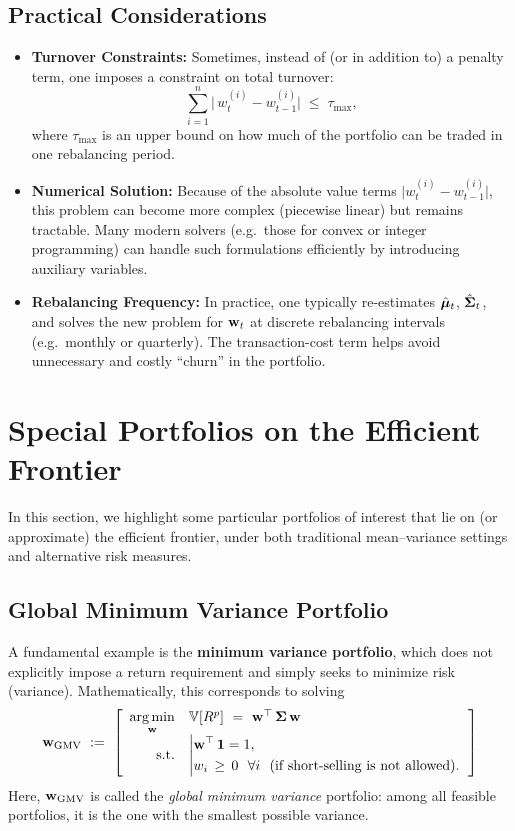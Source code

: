 \subsection{Practical Considerations}
\begin{itemize}
    \item \textbf{Turnover Constraints:} Sometimes, instead of (or in addition to) a penalty term, one imposes a constraint on total turnover:
    \[
        \sum_{i=1}^n \bigl|\,w_t^{(i)} - w_{t-1}^{(i)}\bigr|
        \;\le\;
        \tau_{\max},
    \]
    where \(\tau_{\max}\) is an upper bound on how much of the portfolio can be traded in one rebalancing period.
    
    \item \textbf{Numerical Solution:} Because of the absolute value terms \(\lvert w_t^{(i)} - w_{t-1}^{(i)}\rvert\), this problem can become more complex (piecewise linear) but remains tractable. Many modern solvers (e.g.\ those for convex or integer programming) can handle such formulations efficiently by introducing auxiliary variables.

    \item \textbf{Rebalancing Frequency:} In practice, one typically re-estimates \(\hat{\boldsymbol \mu}_t\), \(\hat{\mathbf \Sigma}_t\), and solves the new problem for \(\mathbf w_t\) at discrete rebalancing intervals (e.g.\ monthly or quarterly). The transaction-cost term helps avoid unnecessary and costly ``churn'' in the portfolio.

\end{itemize}

\section{Special Portfolios on the Efficient Frontier}

In this section, we highlight some particular portfolios of interest that lie on (or approximate) the efficient frontier, under both traditional mean--variance settings and alternative risk measures.

\subsection{Global Minimum Variance Portfolio}
A fundamental example is the \textbf{minimum variance portfolio}, which does not explicitly impose a return requirement and simply seeks to minimize risk (variance). Mathematically, this corresponds to solving
\[
\mathbf w_{\mathrm{GMV}}
~:=~
\left[
\begin{array}{rl}
\underset{\mathbf w}{\arg \min} 
& 
\mathbb{V}[R^p] 
~=~
\mathbf w^\top \,\mathbf \Sigma \,\mathbf w
\\[6pt]
\text{s.t.}
&
\left|
\begin{aligned}
& \mathbf w^\top \,\mathbf 1 = 1,\\
& w_i \,\ge\, 0~~\forall i ~~(\text{if short-selling is not allowed}).
\end{aligned}
\right.
\end{array}
\right]
\]
Here, $\mathbf w_{\mathrm{GMV}}$ is called the \emph{global minimum variance} portfolio: among all feasible portfolios, it is the one with the smallest possible variance.  


